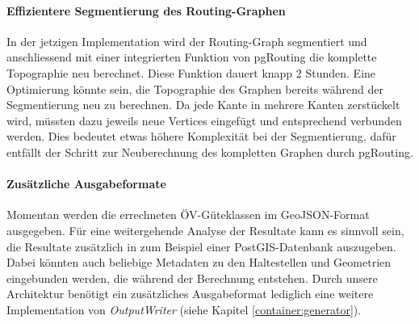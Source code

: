 \paragraph{Effizientere Segmentierung des Routing-Graphen}
In der jetzigen Implementation wird der Routing-Graph segmentiert und anschliessend mit einer integrierten Funktion von pgRouting die komplette Topographie neu berechnet.
Diese Funktion dauert knapp 2 Stunden.
Eine Optimierung könnte sein, die Topographie des Graphen bereits während der Segmentierung neu zu berechnen.
Da jede Kante in mehrere Kanten zerstückelt wird, müssten dazu jeweils neue Vertices eingefügt und entsprechend verbunden werden.
Dies bedeutet etwas höhere Komplexität bei der Segmentierung, dafür entfällt der Schritt zur Neuberechnung des kompletten Graphen durch pgRouting.

\paragraph{Zusätzliche Ausgabeformate}
Momentan werden die errechneten \acs{ÖV}-Güteklassen im \gls{GeoJSON}-Format ausgegeben.
Für eine weitergehende Analyse der Resultate kann es sinnvoll sein, die Resultate zusätzlich in zum Beispiel einer PostGIS-Datenbank auszugeben.
Dabei könnten auch beliebige Metadaten zu den Haltestellen und Geometrien eingebunden werden, die während der Berechnung entstehen.
Durch unsere Architektur benötigt ein zusätzliches Ausgabeformat lediglich eine weitere Implementation von \emph{OutputWriter} (siehe Kapitel \ref{container:generator}).
